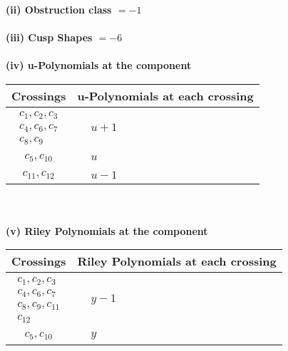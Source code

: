 \documentclass[1p]{elsarticle_modified}
\theoremstyle{definition}
\begin{document}
\flushleft \textbf{(ii) Obstruction class $= -1$}\\~\\
\flushleft \textbf{(iii) Cusp Shapes $= -6$}\\~\\
\newpage\renewcommand{\arraystretch}{1}
\flushleft \textbf{(iv) u-Polynomials at the component}\newline \\
\begin{tabular}{m{50pt}|m{274pt}}
Crossings & \hspace{64pt}u-Polynomials at each crossing \\
\hline $$\begin{aligned}c_{1},c_{2},c_{3}\\c_{4},c_{6},c_{7}\\c_{8},c_{9}\end{aligned}$$&$\begin{aligned}
&u+1
\end{aligned}$\\
\hline $$\begin{aligned}c_{5},c_{10}\end{aligned}$$&$\begin{aligned}
&u
\end{aligned}$\\
\hline $$\begin{aligned}c_{11},c_{12}\end{aligned}$$&$\begin{aligned}
&u-1
\end{aligned}$\\
\hline
\end{tabular}\\~\\
\newpage\renewcommand{\arraystretch}{1}
\flushleft \textbf{(v) Riley Polynomials at the component}\newline \\
\begin{tabular}{m{50pt}|m{274pt}}
Crossings & \hspace{64pt}Riley Polynomials at each crossing \\
\hline $$\begin{aligned}c_{1},c_{2},c_{3}\\c_{4},c_{6},c_{7}\\c_{8},c_{9},c_{11}\\c_{12}\end{aligned}$$&$\begin{aligned}
&y-1
\end{aligned}$\\
\hline $$\begin{aligned}c_{5},c_{10}\end{aligned}$$&$\begin{aligned}
&y
\end{aligned}$\\
\hline
\end{tabular}\\~\\
\end{document}
